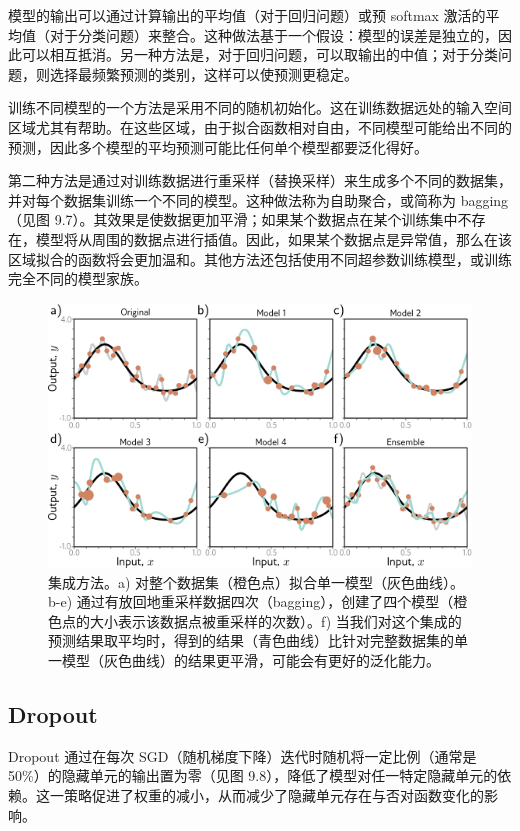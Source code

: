模型的输出可以通过计算输出的平均值（对于回归问题）或预 softmax 激活的平均值（对于分类问题）来整合。这种做法基于一个假设：模型的误差是独立的，因此可以相互抵消。另一种方法是，对于回归问题，可以取输出的中值；对于分类问题，则选择最频繁预测的类别，这样可以使预测更稳定。

训练不同模型的一个方法是采用不同的随机初始化。这在训练数据远处的输入空间区域尤其有帮助。在这些区域，由于拟合函数相对自由，不同模型可能给出不同的预测，因此多个模型的平均预测可能比任何单个模型都要泛化得好。

第二种方法是通过对训练数据进行重采样（替换采样）来生成多个不同的数据集，并对每个数据集训练一个不同的模型。这种做法称为自助聚合，或简称为 bagging（见图 9.7）。其效果是使数据更加平滑；如果某个数据点在某个训练集中不存在，模型将从周围的数据点进行插值。因此，如果某个数据点是异常值，那么在该区域拟合的函数将会更加温和。其他方法还包括使用不同超参数训练模型，或训练完全不同的模型家族。

\begin{figure}[ht!]
	\centering
	\includegraphics[width=0.7\linewidth]{png/chapter9/RegEnsemble.png}
	\caption{集成方法。a) 对整个数据集（橙色点）拟合单一模型（灰色曲线）。b-e) 通过有放回地重采样数据四次（bagging），创建了四个模型（橙色点的大小表示该数据点被重采样的次数）。f) 当我们对这个集成的预测结果取平均时，得到的结果（青色曲线）比针对完整数据集的单一模型（灰色曲线）的结果更平滑，可能会有更好的泛化能力。}
\end{figure}

\subsection{Dropout}
Dropout 通过在每次 SGD（随机梯度下降）迭代时随机将一定比例（通常是 50\%）的隐藏单元的输出置为零（见图 9.8），降低了模型对任一特定隐藏单元的依赖。这一策略促进了权重的减小，从而减少了隐藏单元存在与否对函数变化的影响。

